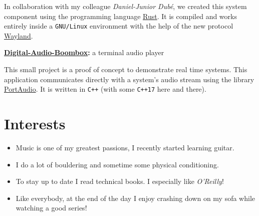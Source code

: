 \documentclass{article}
\begin{document}
	In collaboration with my colleague \textit{Daniel-Junior Dubé}, we created this system component using the programming language \href{https://www.rust-lang.org/}{Rust}. It is compiled and works entirely inside a \texttt{GNU/Linux} environment with the help of the new protocol \href{https://wayland.freedesktop.org/}{Wayland}.

	\bigskip
	{\large \bfseries \href{https://github.com/Chabam/digital-audio-boombox}{Digital-Audio-Boombox}:}
	{\large a terminal audio player}

	This small project is a proof of concept to demonstrate real time systems. This application communicates directly with a system's audio stream using the library \href{http://www.portaudio.com/}{PortAudio}. It is written in \texttt{C++} (with some \texttt{C++17} here and there).

	\section{Interests}
	\begin{itemize}
		\item Music is one of my greatest passions, I recently started learning guitar.
		\item I do a lot of bouldering and sometime some physical conditioning.
		\item To stay up to date I read technical books. I especially like \textit{O'Reilly}!
		\item Like everybody, at the end of the day I enjoy crashing down on my sofa while watching a good series!
	\end{itemize}
\end{document}
